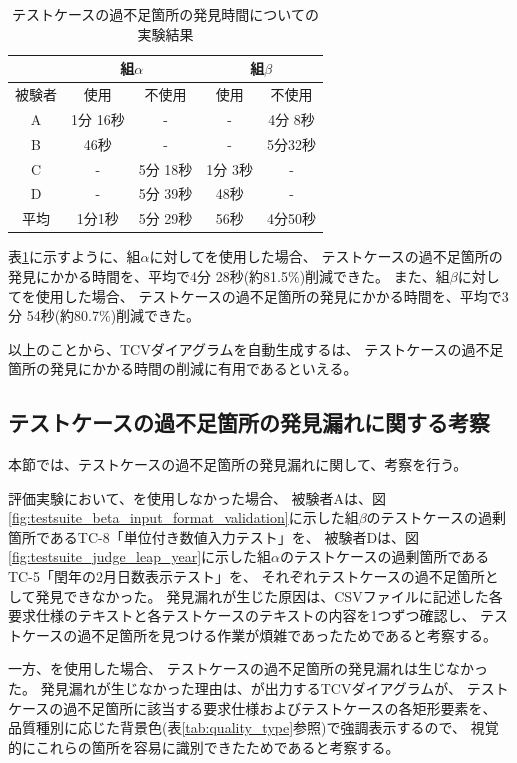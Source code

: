 \begin{table}[tp]
    \centering
    \caption{テストケースの過不足箇所の発見時間についての実験結果}
    \label{tb:exp_result}
    \begin{tabular}{c||c|c|c|c}
        & \multicolumn{2}{|c|}{\textbf{組$\alpha$}}
        & \multicolumn{2}{|c}{\textbf{組$\beta$}} \\
        \hline \hline
        被験者 & \tool{}使用 & \tool{}不使用 & \tool{}使用 & \tool{}不使用  \\
        \hline \hline
        A      & 1分 16秒 & - & - & 4分 8秒 \\
        B      & 46秒 & - & - & 5分32秒 \\
        C      & - & 5分 18秒 & 1分 3秒 & - \\
        D      & - & 5分 39秒 & 48秒 & - \\
        \hline
        平均 & 1分1秒 & 5分 29秒 & 56秒 & 4分50秒 \\
    \end{tabular}
\end{table}

表\ref{tb:exp_result}に示すように、組$\alpha$に対して\tool{}を使用した場合、
テストケースの過不足箇所の発見にかかる時間を、平均で4分 28秒(約81.5\%)削減できた。
また、組$\beta$に対して\tool{}を使用した場合、
テストケースの過不足箇所の発見にかかる時間を、平均で3分 54秒(約80.7\%)削減できた。

以上のことから、TCVダイアグラムを自動生成する\tool{}は、
テストケースの過不足箇所の発見にかかる時間の削減に有用であるといえる。

\subsection{テストケースの過不足箇所の発見漏れに関する考察}
本節では、テストケースの過不足箇所の発見漏れに関して、考察を行う。

評価実験において、\tool{}を使用しなかった場合、
被験者Aは、図\ref{fig:testsuite_beta_input_format_validation}に示した組$\beta$のテストケースの過剰箇所であるTC-8「単位付き数値入力テスト」を、
被験者Dは、図\ref{fig:testsuite_judge_leap_year}に示した組$\alpha$のテストケースの過剰箇所であるTC-5「閏年の2月日数表示テスト」を、
それぞれテストケースの過不足箇所として発見できなかった。
発見漏れが生じた原因は、CSVファイルに記述した各要求仕様のテキストと各テストケースのテキストの内容を1つずつ確認し、
テストケースの過不足箇所を見つける作業が煩雑であったためであると考察する。

一方、\tool{}を使用した場合、
テストケースの過不足箇所の発見漏れは生じなかった。
発見漏れが生じなかった理由は、\tool{}が出力するTCVダイアグラムが、
テストケースの過不足箇所に該当する要求仕様およびテストケースの各矩形要素を、
品質種別に応じた背景色(表\ref{tab:quality_type}参照)で強調表示するので、                                                                                                             
視覚的にこれらの箇所を容易に識別できたためであると考察する。

